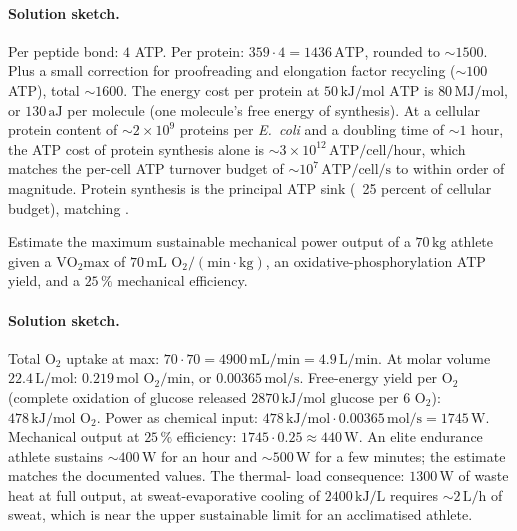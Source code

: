 \paragraph{Solution sketch.}
Per peptide bond: $4$ ATP. Per protein: $359 \cdot 4 = 1436\,\text{ATP}$,
rounded to $\sim 1500$. Plus a small correction for proofreading and
elongation factor recycling ($\sim 100$ ATP), total $\sim 1600$.
The energy cost per protein at $50\,\text{kJ}/\text{mol ATP}$ is
$80\,\text{MJ}/\text{mol}$, or $130\,\text{aJ}$ per molecule
(one molecule's free energy of synthesis). At a cellular protein
content of $\sim 2 \times 10^9$ proteins per \emph{E.~coli} and a
doubling time of $\sim 1$ hour, the ATP cost of protein synthesis
alone is $\sim 3 \times 10^{12}\,\text{ATP/cell/hour}$, which
matches the per-cell ATP turnover budget of $\sim 10^7\,\text{ATP/cell/s}$
to within order of magnitude. Protein synthesis is the principal ATP
sink (~25 percent of cellular budget), matching
\cite{paper:v6c02-rolfe-brown-1997}.

\begin{exercise}
Estimate the maximum sustainable mechanical power output of a
$70\,\text{kg}$ athlete given a $\text{VO}_2\text{max}$ of
$70\,\text{mL O}_2/(\text{min}\cdot\text{kg})$, an oxidative-phosphorylation
ATP yield, and a $25\,\%$ mechanical efficiency.
\end{exercise}

\paragraph{Solution sketch.}
Total O$_2$ uptake at max: $70 \cdot 70 = 4900\,\text{mL/min} = 4.9\,
\text{L/min}$. At molar volume $22.4\,\text{L/mol}$: $0.219\,\text{mol
O}_2/\text{min}$, or $0.00365\,\text{mol/s}$. Free-energy yield per
O$_2$ (complete oxidation of glucose released $2870\,\text{kJ}/\text{mol
glucose}$ per $6$ O$_2$): $478\,\text{kJ}/\text{mol O}_2$. Power as
chemical input: $478\,\text{kJ}/\text{mol} \cdot 0.00365\,\text{mol/s}
= 1745\,\text{W}$. Mechanical output at $25\,\%$ efficiency: $1745
\cdot 0.25 \approx 440\,\text{W}$. An elite endurance athlete sustains
$\sim 400\,\text{W}$ for an hour and $\sim 500\,\text{W}$ for a few
minutes; the estimate matches the documented values. The thermal-
load consequence: $1300\,\text{W}$ of waste heat at full output, at
sweat-evaporative cooling of $2400\,\text{kJ/L}$ requires
$\sim 2\,\text{L/h}$ of sweat, which is near the upper sustainable
limit for an acclimatised athlete.

